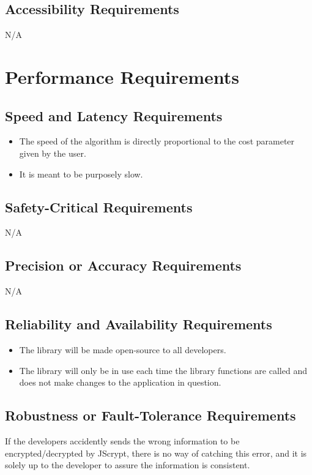 \documentclass[12pt]{article}
\begin{document}
\subsection {Accessibility Requirements}
N/A

\section {Performance Requirements}

\subsection {Speed and Latency Requirements}
\begin{itemize}
  \item The speed of the algorithm is directly proportional to the cost parameter given by the user.
  \item It is meant to be purposely slow.
\end{itemize}

\subsection {Safety-Critical Requirements}
N/A

\subsection {Precision or Accuracy Requirements}
N/A

\subsection {Reliability and Availability Requirements}
\begin{itemize}
  \item The library will be made open-source to all developers.
  \item The library will only be in use each time the library functions are called and does not make changes to the application in question.
\end{itemize}

\subsection {Robustness or Fault-Tolerance Requirements}
If the developers accidently sends the wrong information to be encrypted/decrypted by JScrypt, there is no way of catching this error, and it is solely up to the developer to assure the information is consistent.
\end{document}
